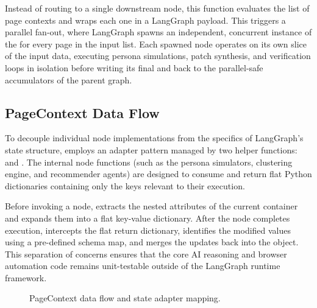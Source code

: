 Instead of routing to a single downstream node, this function evaluates the list of page contexts and wraps each one in a LangGraph  payload. This triggers a parallel fan-out, where LangGraph spawns an independent, concurrent instance of the  for every page in the input list. Each spawned node operates on its own slice of the input data, executing persona simulations, patch synthesis, and verification loops in isolation before writing its final  and  back to the parallel-safe accumulators of the parent graph.

\subsection{PageContext Data Flow}
\label{sec:page-context}

To decouple individual node implementations from the specifics of LangGraph's state structure, \versimux{} employs an adapter pattern managed by two helper functions:  and . The internal node functions (such as the persona simulators, clustering engine, and recommender agents) are designed to consume and return flat Python dictionaries containing only the keys relevant to their execution. 

Before invoking a node,  extracts the nested attributes of the current  container and expands them into a flat key-value dictionary. After the node completes execution,  intercepts the flat return dictionary, identifies the modified values using a pre-defined schema map, and merges the updates back into the  object. This separation of concerns ensures that the core AI reasoning and browser automation code remains unit-testable outside of the LangGraph runtime framework.

\begin{figure}[htbp]
  \centering
  \caption{PageContext data flow and state adapter mapping.}
  \label{fig:pagecontext-flow}
\end{figure}


